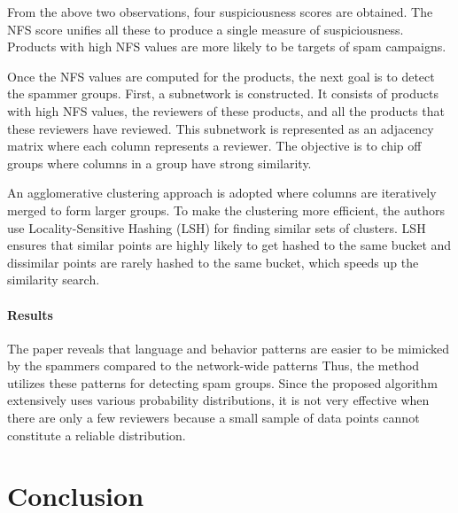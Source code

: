 \documentclass[11pt, oneside]{article}   	%
\begin{document}
\quad From the above two observations, four suspiciousness scores are obtained.
The NFS score unifies all these to produce a single measure of suspiciousness.
Products with high NFS values are more likely to be targets of spam campaigns.

\quad Once the NFS values are computed for the products, the next goal is to detect the spammer groups.
First, a subnetwork is constructed.
It consists of products with high NFS values, the reviewers of these products, and all the products that these reviewers have reviewed.
This subnetwork is represented as an adjacency matrix where each column represents a reviewer.
The objective is to chip off groups where columns in a group have strong similarity.

\quad An agglomerative clustering approach is adopted where columns are iteratively merged to form larger groups.
To make the clustering more efficient, the authors use Locality-Sensitive Hashing (LSH) for finding similar sets of clusters.
LSH ensures that similar points are highly likely to get hashed to the same bucket and dissimilar points are rarely hashed to the same bucket, which speeds up the similarity search.

\paragraph{Results}
\quad

\quad The paper reveals that language and behavior patterns are easier to be mimicked by the spammers compared to the network-wide patterns
Thus, the method utilizes these patterns for detecting spam groups.
Since the proposed algorithm extensively uses various probability distributions, it is not very effective when there are only a few reviewers because a small sample of data points cannot constitute a reliable distribution.

\section{Conclusion}
\end{document}
